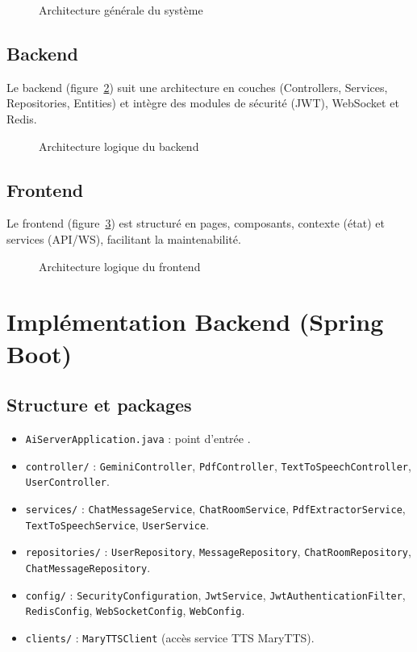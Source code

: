 \documentclass[12pt,a4paper]{report}
\begin{document}
\begin{figure}[H]
  \centering
  
  \caption{Architecture générale du système}
  \label{fig:arch-global}
\end{figure}

\section{Backend}
Le backend (figure~\ref{fig:arch-back}) suit une architecture en couches (Controllers, Services, Repositories, Entities) et intègre des modules de sécurité (JWT), WebSocket et Redis.

\begin{figure}[H]
  \centering
  
  \caption{Architecture logique du backend}
  \label{fig:arch-back}
\end{figure}

\section{Frontend}
Le frontend (figure~\ref{fig:arch-front}) est structuré en pages, composants, contexte (état) et services (API/WS), facilitant la maintenabilité.

\begin{figure}[H]
  \centering
  
  \caption{Architecture logique du frontend}
  \label{fig:arch-front}
\end{figure}

\chapter{Implémentation Backend (Spring Boot)}
\section{Structure et packages}
\begin{itemize}[leftmargin=*,nosep]
  \item \texttt{AiServerApplication.java} : point d'entrée \cite{springboot}.
  \item \texttt{controller/} : \texttt{GeminiController}, \texttt{PdfController}, \texttt{TextToSpeechController}, \texttt{UserController}.
  \item \texttt{services/} : \texttt{ChatMessageService}, \texttt{ChatRoomService}, \texttt{PdfExtractorService}, \texttt{TextToSpeechService}, \texttt{UserService}.
  \item \texttt{repositories/} : \texttt{UserRepository}, \texttt{MessageRepository}, \texttt{ChatRoomRepository}, \texttt{ChatMessageRepository}.
  \item \texttt{config/} : \texttt{SecurityConfiguration}, \texttt{JwtService}, \texttt{JwtAuthenticationFilter}, \texttt{RedisConfig}, \texttt{WebSocketConfig}, \texttt{WebConfig}.
  \item \texttt{clients/} : \texttt{MaryTTSClient} (accès service TTS MaryTTS).
\end{itemize}
\end{document}
